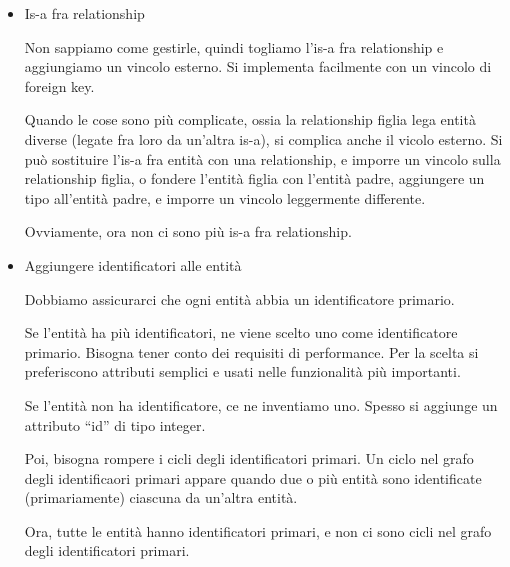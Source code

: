 \begin{itemize}
    In presenza di pi\`u relazioni is-a (non disgiunte) conviene creare attributi booleani per ogni tipo possibile, e fondere le sottoentit\`a nella super-entit\`a.

    Divisione. L'altro approccio \`e quello di \emph{eliminare} la super-entit\`a. Il danno \`e che non si rappresentano pi\`u le super-entit\`a, e i vincoli di identificazione sono divisi. Quindi bisogna aggiungere vincoli esterni. L'approccio funziona con le generalizzazioni complete. Con generalizzazioni incomplete, bisogna aggiungere una ulteriore sottoentit\`a, ``altro'', e rendere la generalizzazione completa prima di dividere tutto.

    Sostituzione. Un altro approccio prevede di sostituire le relazioni is-a con normali relationship. Funziona bene con relazioni is-a non disgiunte. Diventa molto semplice l'implementazione, di solito. Bisogna aggiungere dei vincoli di identificazione sulle relationship. In presenza di generalizzazioni disgiunte (complete o non complete), bisogna aggiungere dei vincoli esterni.

    Ora non abbiamo pi\`u generalizzazioni, e le entit\`a sono disgiunte a coppie.
    \item Is-a fra relationship

    Non sappiamo come gestirle, quindi togliamo l'is-a fra relationship e aggiungiamo un vincolo esterno. Si implementa facilmente con un vincolo di foreign key.

    Quando le cose sono pi\`u complicate, ossia la relationship figlia lega entit\`a diverse (legate fra loro da un'altra is-a), si complica anche il vicolo esterno. Si pu\`o sostituire l'is-a fra entit\`a con una relationship, e imporre un vincolo sulla relationship figlia, o fondere l'entit\`a figlia con l'entit\`a padre, aggiungere un tipo all'entit\`a padre, e imporre un vincolo leggermente differente.

    Ovviamente, ora non ci sono pi\`u is-a fra relationship.
    \item Aggiungere identificatori alle entit\`a

    Dobbiamo assicurarci che ogni entit\`a abbia un identificatore primario.

    Se l'entit\`a ha pi\`u identificatori, ne viene scelto uno come identificatore primario. Bisogna tener conto dei requisiti di performance. Per la scelta si preferiscono attributi semplici e usati nelle funzionalit\`a pi\`u importanti.

    Se l'entit\`a non ha identificatore, ce ne inventiamo uno. Spesso si aggiunge un attributo ``id'' di tipo integer.

    Poi, bisogna rompere i cicli degli identificatori primari. Un ciclo nel grafo degli identificaori primari appare quando due o pi\`u entit\`a sono identificate (primariamente) ciascuna da un'altra entit\`a.

    Ora, tutte le entit\`a hanno identificatori primari, e non ci sono cicli nel grafo degli identificatori primari.
\end{itemize}

